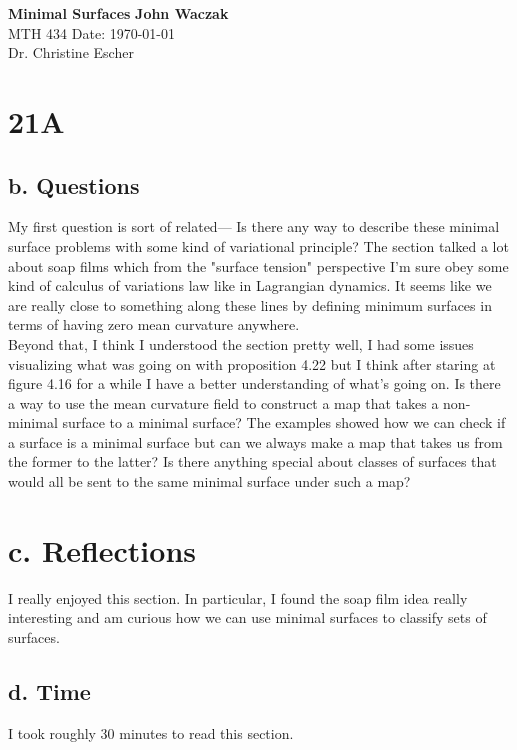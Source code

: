 \documentclass[a4paper, 11pt]{article}
\begin{document}
\noindent
\large\textbf{Minimal Surfaces} \hfill \textbf{John Waczak} \\
\normalsize MTH 434 \hfill  Date: \today \\
Dr. Christine Escher \\

\section*{21A}
	\subsection*{b. Questions}
	 
	 My first question is sort of related--- Is there any way to describe these minimal surface problems with some kind of variational principle? The section talked a lot about soap films which from the "surface tension" perspective I'm sure obey some kind of calculus of variations law like in Lagrangian dynamics. It seems like we are really close to something along these lines by defining minimum surfaces in terms of having zero mean curvature anywhere. \\
	 
	 Beyond that, I think I understood the section pretty well, I had some issues visualizing what was going on with proposition 4.22 but I think after staring at figure 4.16 for a while I have a better understanding of what's going on. Is there a way to use the mean curvature field to construct a map that takes a non-minimal surface to a minimal surface? The examples showed how we can check if a surface is a minimal surface but can we always make a map that takes us from the former to the latter?  Is there anything special about classes of surfaces that would all be sent to the same minimal surface under such a map? 
	
	\section*{c. Reflections}
	I really enjoyed this section. In particular,  I found the soap film idea really interesting and am curious how we can use minimal surfaces to classify sets of surfaces.
	
	\subsection*{d. Time}
	I took roughly 30 minutes to read this section. 
\end{document}
